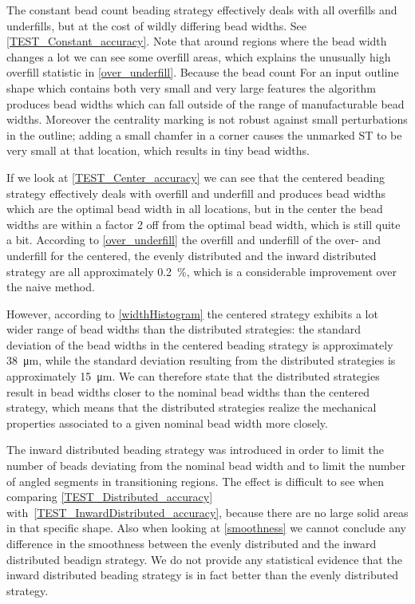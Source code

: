 
The constant bead count beading strategy effectively deals with all overfills and underfills, but at the cost of wildly differing bead widths.
See \cref{TEST_Constant_accuracy}.
Note that around regions where the bead width changes a lot we can see some overfill areas, which explains the unusually high overfill statistic in \cref{over_underfill}.
Because the bead count 
For an input outline shape which contains both very small and very large features the algorithm produces bead widths which can fall outside of the range of manufacturable bead widths.
Moreover the centrality marking is not robust against small perturbations in the outline; adding a small chamfer in a corner causes the unmarked ST to be very small at that location, which results in tiny bead widths.

If we look at \cref{TEST_Center_accuracy} we can see that
the centered beading strategy effectively deals with overfill and underfill and produces bead widths which are the optimal bead width in all locations, but in the center the bead widths are within a factor 2 off from the optimal bead width, which is still quite a bit.
According to \cref{over_underfill} the overfill and underfill of the over- and underfill for the centered, the evenly distributed and the inward distributed strategy are all approximately \SI{0.2}{\percent}, which is a considerable improvement over the naive method.

However, according to \cref{widthHistogram} the centered strategy exhibits a lot wider range of bead widths than the distributed strategies:
the standard deviation of the bead widths in the centered beading strategy is approximately \SI{38}{\micro\meter}, while the standard deviation resulting from the distributed strategies is approximately \SI{15}{\micro\meter}.
We can therefore state that the distributed strategies result in bead widths closer to the nominal bead widths than the centered strategy, which means that the distributed strategies realize the mechanical properties associated to a given nominal bead width more closely.

The inward distributed beading strategy was introduced in order to limit the number of beads deviating from the nominal bead width and to limit the number of angled segments in transitioning regions.
The effect is difficult to see when comparing \cref{TEST_Distributed_accuracy} with~\ref{TEST_InwardDistributed_accuracy}, because there are no large solid areas in that specific shape.
Also when looking at \cref{smoothness} we cannot conclude any difference in the smoothness between the evenly distributed and the inward distributed beadign strategy.
We do not provide any statistical evidence that the inward distributed beading strategy is in fact better than the evenly distributed strategy.

